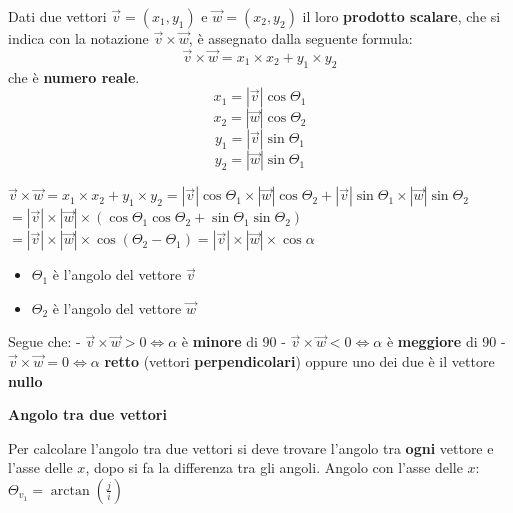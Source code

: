 \documentclass{article}
\begin{document}
Dati due vettori $\overrightarrow{v}=(x_1, y_1)$ e $\overrightarrow{w}=(x_2,y_2)$ il loro \textbf{prodotto scalare}, che si indica con la notazione $\overrightarrow{v}\times\overrightarrow{w}$, è assegnato dalla seguente formula:
\begin{equation*}
  \overrightarrow{v}\times\overrightarrow{w}= x_1 \times x_2 + y_1 \times y_2 
\end{equation*} che è \textbf{numero reale}.
\begin{equation*}
  x_1=|\overrightarrow{v}|\cos\Theta_1
\end{equation*}
\begin{equation*}
  x_2=|\overrightarrow{w}|\cos\Theta_2
\end{equation*}
\begin{equation*}
  y_1=|\overrightarrow{v}|\sin\Theta_1
\end{equation*}
\begin{equation*}
  y_2=|\overrightarrow{w}|\sin\Theta_1
\end{equation*}


$\overrightarrow{v}\times\overrightarrow{w}= x_1 \times x_2 + y_1 \times y_2 = |\overrightarrow{v}|\cos\Theta_1 \times |\overrightarrow{w}|\cos\Theta_2+|\overrightarrow{v}|\sin\Theta_1 \times |\overrightarrow{w}|\sin\Theta_2$\\
$=|\overrightarrow{v}|\times|\overrightarrow{w}|\times(\cos\Theta_1\cos\Theta_2+\sin\Theta_1\sin\Theta_2)$\\
$=|\overrightarrow{v}|\times|\overrightarrow{w}|\times\cos(\Theta_2-\Theta_1) = |\overrightarrow{v}|\times|\overrightarrow{w}| \times\cos\alpha$\\
\begin{itemize}
  \item $\Theta_1$ è l'angolo del vettore $\overrightarrow{v}$
  \item $\Theta_2$ è l'angolo del vettore $\overrightarrow{w}$
\end{itemize}


Segue che:
  - $\overrightarrow{v}\times\overrightarrow{w}> 0\iff \alpha$ è \textbf{minore} di 90
  - $\overrightarrow{v}\times\overrightarrow{w}< 0\iff \alpha$ è \textbf{meggiore} di 90
  - $\overrightarrow{v}\times\overrightarrow{w}= 0\iff \alpha$ \textbf{retto} (vettori \textbf{perpendicolari}) oppure uno dei due è il vettore \textbf{nullo}

\textbf{Angolo tra due vettori}

Per calcolare l'angolo tra due vettori si deve trovare l'angolo tra \textbf{ogni} vettore e l'asse delle $x$, dopo si fa la differenza tra gli angoli.
Angolo con l'asse delle $x$: $\Theta_{v_1}=\arctan(\frac{j}{i})$
\end{document}
